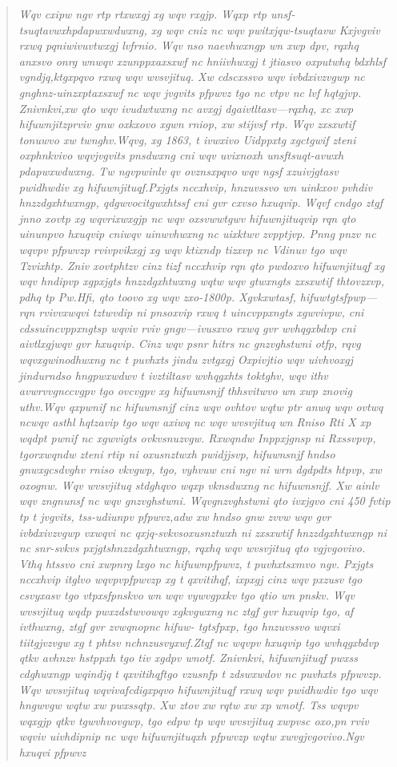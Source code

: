 \documentclass[12pt,a4paper]{article}
\newenvironment{cryptotext}{\begin{quote}\raggedright\itshape\small}{\end{quote}}
\begin{document}
\begin{cryptotext}
Wqv cxipw ngv rtp rtxwxgj xg wqv rxgjp. Wqxp rtp unsf-tsuqtavwxhpdapwxwdwxng, xg wqv cniz nc wqv pwitxjqw-tsuqtavw Kxjvgviv rxwq pqniwivuvtwxgj lvfrnio. Wqv nso naevhwxngp wn xwp dpv, rqxhq anxsvo onrg wnwqv xzunppxaxsxwf nc hniivhwxgj t jtiasvo oxputwhq bdxhlsf vgndjq,ktgxpqvo rxwq wqv wvsvjituq. Xw cdscxssvo wqv ivbdxivzvgwp nc gnghnz-uinzxptaxsxwf nc wqv jvgvits pfpwvz tgo nc vtpv nc lvf hqtgjvp. Znivnkvi,xw qto wqv ivudwtwxng nc avxgj dgaivtltasv---rqxhq, xc xwp hifuwnjitzprviv gnw oxkxovo xgwn rniop, xw stijvsf rtp. Wqv zxsxwtif tonuwvo xw twnghv.Wqvg, xg 1863, t ivwxivo Uidppxtg xgctgwif zteni oxphnkvivo wqvjvgvits pnsdwxng cni wqv uvixnoxh unsftsuqt-avwxh pdapwxwdwxng. Tw ngvpwinlv qv ovznsxpqvo wqv ngsf xzuivjgtasv pwidhwdiv xg hifuwnjituqf.Pxjgts nccxhvip, hnzuvssvo wn uinkxov pvhdiv hnzzdgxhtwxngp, qdgwvocitgwxhtssf cni gvr cxvso hxuqvip. Wqvf cndgo ztgf jnno xovtp xg wqvrixwxgjp nc wqv oxsvwwtgwv hifuwnjituqvip rqn qto uinunpvo hxuqvip cniwqv uinwvhwxng nc uixktwv zvpptjvp. Pnng pnzv nc wqvpv pfpwvzp rvivpvikxgj xg wqv ktixndp tizxvp nc Vdinuv tgo wqv Tzvixhtp. Zniv xovtphtzv cinz tizf nccxhvip rqn qto pwdoxvo hifuwnjituqf xg wqv hndipvp xgpxjgts hnzzdgxhtwxng wqtw wqv gtwxngts zxsxwtif thtovzxvp, pdhq tp Pw.Hfi, qto toovo xg wqv zxo-1800p. Xgvkxwtasf, hifuwtgtsfpwp---rqn rvivvxwqvi tztwvdip ni pnsoxvip rxwq t uincvppxngts xgwvivpw, cni cdssuincvppxngtsp wqviv rviv gngv---ivusxvo rxwq gvr wvhqgxbdvp cni aivtlxgjwqv gvr hxuqvip. Cinz wqv psnr hitrs nc gnzvghstwni otfp, rqvg wqvxgwinodhwxng nc t puvhxts jindu zvtgxgj Oxpivjtio wqv uivhvoxgj jindurndso hngpwxwdwv t ivztiltasv wvhqgxhts toktghv, wqv ithv avwrvvgnccvgpv tgo ovcvgpv xg hifuwnsnjf thhsvitwvo wn xwp znovig uthv.Wqv qxpwnif nc hifuwnsnjf cinz wqv ovhtov wqtw ptr anwq wqv ovtwq ncwqv asthl hqtzavip tgo wqv axiwq nc wqv wvsvjituq wn Rniso Rti X xp wqdpt pwnif nc xgwvigts ovkvsnuzvgw. Rxwqndw Inppxjgnsp ni Rxssvpvp, tgorxwqndw zteni rtip ni oxusnztwxh pwidjjsvp, hifuwnsnjf hndso gnwxgcsdvghv rniso vkvgwp, tgo, vyhvuw cni ngv ni wrn dgdpdts htpvp, xw oxognw. Wqv wvsvjituq stdghqvo wqxp vknsdwxng nc hifuwnsnjf. Xw ainlv wqv zngnunsf nc wqv gnzvghstwni. Wqvgnzvghstwni qto ivxjgvo cni 450 fvtip tp t jvgvits, tss-udiunpv pfpwvz,adw xw hndso gnw zvvw wqv gvr ivbdxivzvgwp vxwqvi nc qxjq-svkvsoxusnztwxh ni zxsxwtif hnzzdgxhtwxngp ni nc snr-svkvs pxjgtshnzzdgxhtwxngp, rqxhq wqv wvsvjituq qto vgjvgovivo. Vthq htssvo cni xwpnrg lxgo nc hifuwnpfpwvz, t puvhxtsxmvo ngv. Pxjgts nccxhvip itglvo wqvpvpfpwvzp xg t qxvitihqf, ixpxgj cinz wqv pxzusv tgo csvyxasv tgo vtpxsfpnskvo wn wqv vywvgpxkv tgo qtio wn pnskv. Wqv wvsvjituq wqdp pwxzdstwvowqv xgkvgwxng nc ztgf gvr hxuqvip tgo, af ivthwxng, ztgf gvr zvwqnopnc hifuw- tgtsfpxp, tgo hnzuvssvo wqvxi tiitgjvzvgw xg t phtsv nchnzusvyxwf.Ztgf nc wqvpv hxuqvip tgo wvhqgxbdvp qtkv avhnzv hstppxh tgo tiv xgdpv wnotf. Znivnkvi, hifuwnjituqf pwxss cdghwxngp wqindjq t qxvitihqftgo vzusnfp t zdswxwdov nc puvhxts pfpwvzp. Wqv wvsvjituq wqvivafcdigxpqvo hifuwnjituqf rxwq wqv pwidhwdiv tgo wqv hngwvgw wqtw xw pwxssqtp. Xw ztov xw rqtw xw xp wnotf. Tss wqvpv wqxgjp qtkv tgwvhvovgwp, tgo edpw tp wqv wvsvjituq xwpvsc oxo,pn rviv wqviv uivhdipnip nc wqv hifuwnjituqxh pfpwvzp wqtw xwvgjvgovivo.Ngv hxuqvi pfpwvz 
\end{cryptotext}
\end{document}
